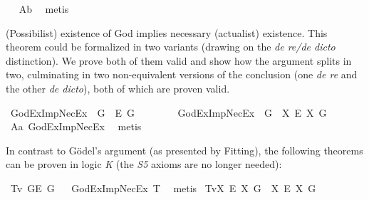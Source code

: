 \begin{isabellebody}
\ %
%
\isamarkupfalse%
\ A{}b\ \isamarkupfalse%
\ metis%
%
%
%
\begin{isamarkuptext}%
(Possibilist) existence of God implies necessary (actualist) existence.
This theorem could be formalized in two variants (drawing on the \emph{de re/de dicto} distinction).
We prove both of them valid and show how the argument splits in two, culminating in two non-equivalent versions
of the conclusion (one \emph{de re} and the other \emph{de dicto}), both of which are proven valid.%
\end{isamarkuptext}\isamarkuptrue%
\isamarkupfalse%
\ GodExImpNecEx{}{\isacharcolon}\ {\isachardoublequoteopen}{\isasymlfloor}\isactrlbold {\isasymexists}\ \isactrlbold {\isasymdown}G\ \isactrlbold {\isasymrightarrow}\ \isactrlbold {\isasymbox}\isactrlbold {\isasymexists}\isactrlsup E\ \isactrlbold {\isasymdown}G{\isasymrfloor}{\isachardoublequoteclose}%
\ %
%
\isamarkupfalse%
\ {\isacharminus}\ %
%
%
%
\ \ \isanewline
{}\isamarkupfalse%
\ GodExImpNecEx{}{\isacharcolon}\ {\isachardoublequoteopen}{\isasymlfloor}\isactrlbold {\isasymexists}\ \isactrlbold {\isasymdown}G\ \isactrlbold {\isasymrightarrow}\ {\isacharparenleft}{\isacharparenleft}{\isasymlambda}X{\isachardot}\ \isactrlbold {\isasymbox}\isactrlbold {\isasymexists}\isactrlsup E\ X{\isacharparenright}\ \isactrlbold {\isasymdown}G{\isacharparenright}{\isasymrfloor}{\isachardoublequoteclose}\isanewline
%
\ \ %
%
\isamarkupfalse%
\ A{}a\ GodExImpNecEx{}\ \isamarkupfalse%
\ metis%
%
%
%
\begin{isamarkuptext}%
In contrast to G\"odel's argument (as presented by Fitting), the following theorems can be proven in logic \emph{K}
 (the \emph{S5} axioms are no longer needed):%
\end{isamarkuptext}\isamarkuptrue%
\isamarkupfalse%
\ T{}v{}{\isacharcolon}{\isachardoublequoteopen}{\isasymlfloor}\isactrlbold {\isasymdiamond}\isactrlbold {\isasymexists}\ \isactrlbold {\isasymdown}G{\isasymrfloor}{\isasymlongrightarrow}{\isasymlfloor}\isactrlbold {\isasymbox}\isactrlbold {\isasymexists}\isactrlsup E\ \isactrlbold {\isasymdown}G{\isasymrfloor}{\isachardoublequoteclose}%
\ %
%
\isamarkupfalse%
\ GodExImpNecEx{}\ T{}\ \isamarkupfalse%
\ metis%
%
%
\isanewline
{}\isamarkupfalse%
\ T{}v{}{\isacharcolon}{\isachardoublequoteopen}{\isasymlfloor}{\isacharparenleft}{\isasymlambda}X{\isachardot}\ \isactrlbold {\isasymdiamond}\isactrlbold {\isasymexists}\isactrlsup E\ X{\isacharparenright}\ \isactrlbold {\isasymdown}G{\isasymrfloor}\ {\isasymlongrightarrow}\ {\isasymlfloor}{\isacharparenleft}{\isasymlambda}X{\isachardot}\ \isactrlbold {\isasymbox}\isactrlbold {\isasymexists}\isactrlsup E\ X{\isacharparenright}\ \isactrlbold {\isasymdown}G{\isasymrfloor}{\isachardoublequoteclose}\isanewline

\end{isabellebody}
